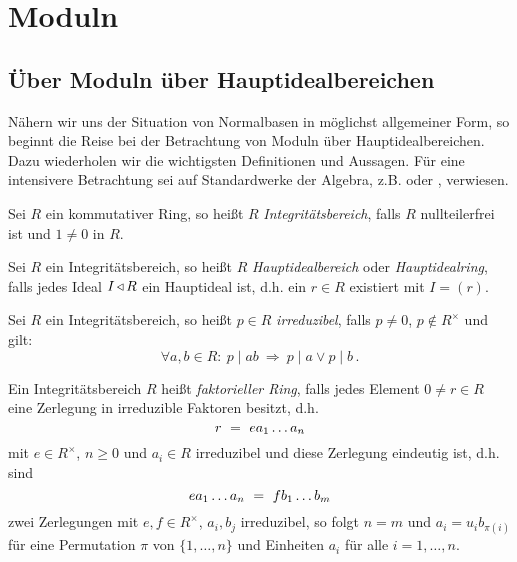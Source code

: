 \chapter{Moduln}

\section{Über Moduln über Hauptidealbereichen}

Nähern wir uns der Situation von Normalbasen in möglichst allgemeiner Form, so
beginnt die Reise bei der Betrachtung von Moduln über Hauptidealbereichen. Dazu
wiederholen wir die wichtigsten Definitionen und Aussagen. Für eine intensivere
Betrachtung sei auf Standardwerke der Algebra, z.B. 
\autocite{lang2002algebra} oder \autocite{hartley1974rings}, verwiesen.

\begin{definition}[Integritätsbereich]
  Sei $R$ ein kommutativer Ring, so heißt $R$ \emph{Integritätsbereich},
  falls $R$ nullteilerfrei ist und $1\neq 0$ in $R$.
\end{definition}

\begin{definition}[Hauptidealbereich]
  Sei $R$ ein Integritätsbereich, so heißt $R$ \emph{Hauptidealbereich}
  oder \emph{Hauptidealring}, falls jedes Ideal $I\operatorname{\triangleleft} R$ ein
  Hauptideal ist, d.h. ein $r \in R$ existiert mit
  $I = (r)$.
\end{definition}

\begin{definition}
  Sei $R$ ein Integritätsbereich, so heißt $p\in R$ 
  \emph{irreduzibel}, falls $p\neq 0$, $p\notin R^\times$ und
  gilt:
  \[ \forall a,b \in R:\ p \mid ab \ \Rightarrow\ 
    p\mid a \lor p\mid b\,.\]
\end{definition}

\begin{definition}
  Ein Integritätsbereich $R$ heißt \emph{faktorieller Ring}, falls jedes
  Element $0\neq r \in R$ eine Zerlegung in irreduzible Faktoren besitzt, d.h.
  \[ r \ =\  e a_1 \ldots a_n\]
  mit $e \in R^\times$, $n\geq 0$ und $a_i\in R$ irreduzibel und diese
  Zerlegung eindeutig ist, d.h.  sind 
  \[ e a_1 \ldots a_n \ =\  f b_1 \ldots b_m \]
  zwei Zerlegungen mit $e, f\in R^\times$, $a_i,b_j$ irreduzibel, so
  folgt $n = m$ und $a_i = u_i b_{\pi(i)}$ für eine Permutation
  $\pi$ von $\{1,\ldots,n\}$ und Einheiten $a_i$ für alle $i=1,\ldots,n$.
\end{definition}

